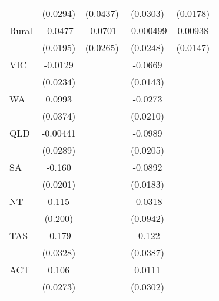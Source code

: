 {\begin{tabular}{l*{4}{c}}
                    &    (0.0294)         &    (0.0437)         &    (0.0303)         &    (0.0178)         \\
[1em]
Rural               &     -0.0477\sym{*}  &     -0.0701\sym{**} &   -0.000499         &     0.00938         \\
                    &    (0.0195)         &    (0.0265)         &    (0.0248)         &    (0.0147)         \\
[1em]
VIC                 &     -0.0129         &                     &     -0.0669\sym{***}&                     \\
                    &    (0.0234)         &                     &    (0.0143)         &                     \\
[1em]
WA                  &      0.0993\sym{**} &                     &     -0.0273         &                     \\
                    &    (0.0374)         &                     &    (0.0210)         &                     \\
[1em]
QLD                 &    -0.00441         &                     &     -0.0989\sym{***}&                     \\
                    &    (0.0289)         &                     &    (0.0205)         &                     \\
[1em]
SA                  &      -0.160\sym{***}&                     &     -0.0892\sym{***}&                     \\
                    &    (0.0201)         &                     &    (0.0183)         &                     \\
[1em]
NT                  &       0.115         &                     &     -0.0318         &                     \\
                    &     (0.200)         &                     &    (0.0942)         &                     \\
[1em]
TAS                 &      -0.179\sym{***}&                     &      -0.122\sym{**} &                     \\
                    &    (0.0328)         &                     &    (0.0387)         &                     \\
[1em]
ACT                 &       0.106\sym{***}&                     &      0.0111         &                     \\
                    &    (0.0273)         &                     &    (0.0302)         &                     \\

\end{tabular}}

